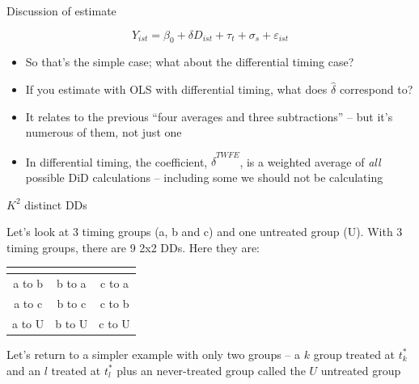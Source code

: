 \documentclass{beamer}
\begin{document}
\begin{frame}{Discussion of estimate}


$$Y_{ist} = \beta_0 + \delta D_{ist} + \tau_t + \sigma_s + \varepsilon_{ist}$$


\begin{itemize}
\item So that's the simple case; what about the differential timing case?  

\item If you estimate with OLS with differential timing, what does $\widehat{\delta}$ correspond to?
\item It relates to the previous ``four averages and three subtractions'' -- but it's numerous of them, not just one
\item In differential timing, the coefficient, $\widehat{\delta}^{TWFE}$, is a weighted average of \emph{all} possible DiD calculations -- including some we should not be calculating

\end{itemize}

\end{frame}






\begin{frame}{$K^2$ distinct DDs}

Let's look at 3 timing groups (a, b and c) and one untreated group (U).  With 3 timing groups, there are 9 2x2 DDs.  Here they are:


\begin{center}
\begin{tabular}{c|c|c}
\multicolumn{1}{l}{} &
\multicolumn{1}{l}{} &
\multicolumn{1}{l}{} \\
\midrule
a to b & b to a & c to a \\
a to c & b to c & c to b \\
a to U & b to U & c to U \\
\midrule
\end{tabular}
\end{center}

\bigskip

Let's return to a simpler example with only two groups -- a $k$ group treated at $t_k^*$ and an $l$ treated at $t_l^*$ plus an never-treated group called the $U$ untreated group
\end{frame} 
\end{document}
